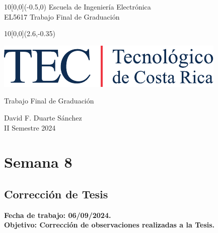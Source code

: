 \documentclass[12pt,letterpaper]{article}
\newcommand{\EstudianteA}{David F. Duarte Sánchez}
\begin{document}
	
\graphicspath{{./}{./fig/}}


%
\begin{textblock}{10}[0,0](-0.5,0)
	\large Escuela de Ingeniería Electrónica \\ 
	EL5617 Trabajo Final de Graduación \\
\end{textblock}

%
\begin{textblock}{10}[0,0](2.6,-0.35)
	\begin{flushright}
		\includegraphics[scale=0.8]{Firma_TEC-4.pdf}
	\end{flushright}
\end{textblock}

\begin{center}
	\vspace{70mm}
	{\large\color{tecRojo} Trabajo Final de Graduación}
	\par\vspace{8mm}
	{\Large\bf\color{tecAzul}{Bitácora de Trabajo - Entrega 3}}
	\par\vspace{100mm}
	{{\EstudianteA \\ II Semestre 2024} 
	\vspace{8mm}}
\end{center}

\newpage

\renewcommand{\baselinestretch}{1.1}    %


\section{Semana 8}
\subsection{Corrección de Tesis}

\bf{Fecha de trabajo:} 06/09/2024.\\
\bf{Objetivo:} Corrección de observaciones realizadas a la Tesis.
\end{document}
